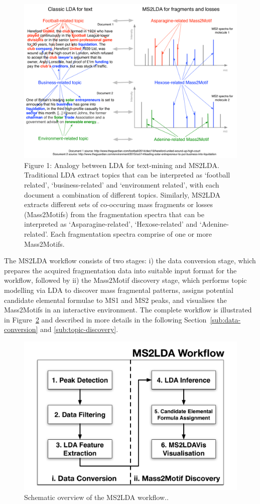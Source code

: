 \begin{figure}[!htbp]
\centering\includegraphics[width=0.6\linewidth]{07-lda/figures/text2frags.pdf}
\centering\caption{Figure 1: Analogy between LDA for text-mining and MS2LDA. Traditional LDA extract topics that can be interpreted as ‘football related’, ‘business-related’ and ‘environment related’, with each document a combination of different topics. Similarly, MS2LDA extracts different sets of co-occuring mass fragments or losses (Mass2Motifs) from the fragmentation spectra that can be interpreted as ‘Asparagine-related’, ‘Hexose-related’ and ‘Adenine-related’. Each fragmentation spectra comprise of one or more Mass2Motifs.\label{fig:text2frags}}
\end{figure}

The MS2LDA workflow consists of two stages: i) the data conversion stage, which prepares the acquired fragmentation data into suitable input format for the workflow, followed by ii) the Mass2Motif discovery stage, which performs topic modelling via LDA to discover mass fragmental patterns, assigns potential candidate elemental formulae to MS1 and MS2 peaks, and visualises the Mass2Motifs in an interactive environment. The complete workflow is illustrated in Figure~\ref{fig:m2lda-workflow} and described in more details in the following Section~\ref{sub:data-conversion} and \ref{sub:topic-discovery}.

\begin{figure}[!htbp]
\centering\includegraphics[width=0.6\linewidth]{07-lda/figures/ms2lda.pdf}
\centering\caption{Schematic overview of the MS2LDA workflow..\label{fig:m2lda-workflow}}
\end{figure}


